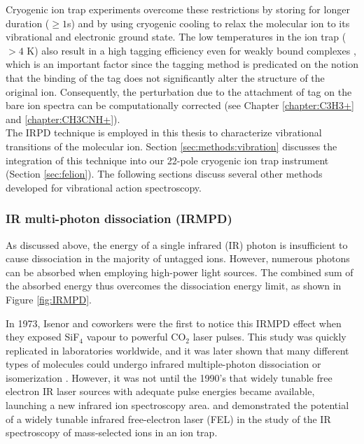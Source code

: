 Cryogenic ion trap experiments overcome these restrictions \cite{asmis_mass-selected_2002, kohguchi_high-resolution_2018, jusko_felion_2019, topfer_spectroscopic_2020, dahlmann_predissociation_2022} by storing for longer duration ($\geq 1$s) and by using cryogenic cooling to relax the molecular ion to its vibrational and electronic ground state. The low temperatures in the ion trap ($> 4$ K) also result in a high tagging efficiency even for weakly bound complexes \cite{roithova_helium_2016, gerlich_infrared_2018}, which is an important factor since the tagging method is predicated on the notion that the binding of the tag does not significantly alter the structure of the original ion. Consequently, the perturbation due to the attachment of tag on the bare ion spectra can be  computationally corrected (see Chapter \ref{chapter:C3H3+} and \ref{chapter:CH3CNH+}).\\

The IRPD technique is employed in this thesis to characterize vibrational transitions of the molecular ion. Section \ref{sec:methods:vibration} discusses the integration of this technique into our 22-pole cryogenic ion trap instrument (Section \ref{sec:felion}). The following sections discuss several other methods developed for vibrational action spectroscopy.

\subsubsection{IR multi-photon dissociation (IRMPD)}
\label{subsec:action:methods:vibrational:IRMPD}

As discussed above, the energy of a single infrared (IR) photon is insufficient to cause dissociation in the majority of untagged ions. However, numerous photons can be absorbed when employing high-power light sources. The combined sum of the absorbed energy thus overcomes the dissociation energy limit, as shown in Figure \ref{fig:IRMPD}.

In 1973, Isenor and coworkers \cite{isenor_co2_1973} were the first to notice this IRMPD effect when they exposed SiF$_4$ vapour to powerful CO$_2$ laser pulses. This study was quickly replicated in laboratories worldwide, and it was later shown that many different types of molecules could undergo infrared multiple-photon dissociation or isomerization \cite{wight_infrared_1981, gaumann_infrared_1990, peiris_infrared_1993}. However, it was not until the 1990's that widely tunable free electron IR laser sources with adequate pulse energies became available, launching a new infrared ion spectroscopy area. \citet{oomens_gas-phase_2000} and \citet{lemaire_gas_2002} demonstrated the potential of a widely tunable infrared free-electron laser (FEL) in the study of the IR spectroscopy of mass-selected ions in an ion trap. 

